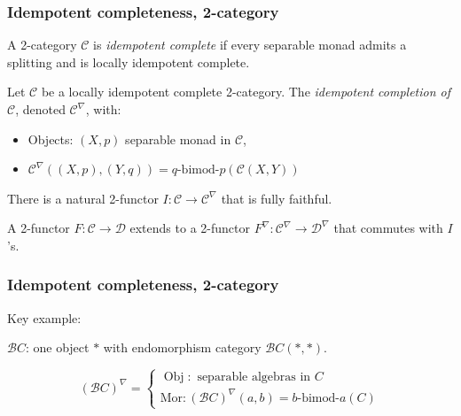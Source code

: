 \documentclass{beamer}
\DeclareMathOperator{\Obj}{Obj}
\newcommand{\cB}{{\mathcal{B}}}
\newcommand{\cC}{{\mathcal{C}}}
\newcommand{\cD}{{\mathcal{D}}}
\newcommand{\bimod}[2]{{#1\textrm{-bimod-}#2}}
\begin{document}
\begin{frame}
\frametitle{Idempotent completeness, 2-category}

\begin{definition}
A 2-category $\cC$ is \emph{idempotent complete}
if every separable monad admits a splitting
and is locally idempotent complete.
\end{definition}

\pause

\begin{definition}
Let $\cC$ be a locally idempotent complete 2-category.
The \emph{idempotent completion of $\cC$},
denoted $\cC^\nabla$, with:
\begin{itemize}
\item Objects: $(X,p)$ separable monad in $\cC$,
\item $\cC^\nabla((X,p),(Y,q)) = \bimod{q}{p}(\cC(X,Y))$
\end{itemize}

\pause

There is a natural 2-functor $I: \cC \to \cC^\nabla$
that is fully faithful.

\pause

A 2-functor $F: \cC \to \cD$
extends to a 2-functor $F^\nabla: \cC^\nabla \to \cD^\nabla$
that commutes with $I$'s.
\end{definition}

\end{frame}

\begin{frame}
\frametitle{Idempotent completeness, 2-category}

Key example:

$\cB C$: one object $*$ with endomorphism category
$\cB C(*,*)$.

\[
(\cB C)^\nabla =
\begin{cases}
	\Obj: \text{ separable algebras in } C
	\\
	\text{Mor}: (\cB C)^\nabla (a,b) = \bimod{b}{a}(C)
\end{cases}
\]


\end{frame}
\end{document}

